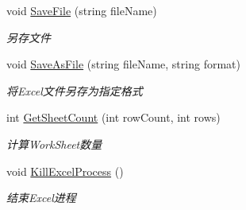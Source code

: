 \begin{DoxyCompactItemize}
void \hyperlink{class_x_c_l_net_tools_1_1_office_1_1_excel_handler_1_1_excel_helper_a742f97d7ca4451c93efcfe05be0e7235}{Save\-File} (string file\-Name)
\begin{DoxyCompactList}\small\item\em 另存文件 \end{DoxyCompactList}\item 
void \hyperlink{class_x_c_l_net_tools_1_1_office_1_1_excel_handler_1_1_excel_helper_a3d543e54860a7a9d7fca6abd2adff0db}{Save\-As\-File} (string file\-Name, string format)
\begin{DoxyCompactList}\small\item\em 将\-Excel文件另存为指定格式 \end{DoxyCompactList}\item 
int \hyperlink{class_x_c_l_net_tools_1_1_office_1_1_excel_handler_1_1_excel_helper_a3192422a44e6781c0242c76afaafa1a6}{Get\-Sheet\-Count} (int row\-Count, int rows)
\begin{DoxyCompactList}\small\item\em 计算\-Work\-Sheet数量 \end{DoxyCompactList}\item 
void \hyperlink{class_x_c_l_net_tools_1_1_office_1_1_excel_handler_1_1_excel_helper_a2796fbae8cdad3f7740bd6f28cef5956}{Kill\-Excel\-Process} ()
\begin{DoxyCompactList}\small\item\em 结束\-Excel进程 \end{DoxyCompactList}\end{DoxyCompactItemize}
